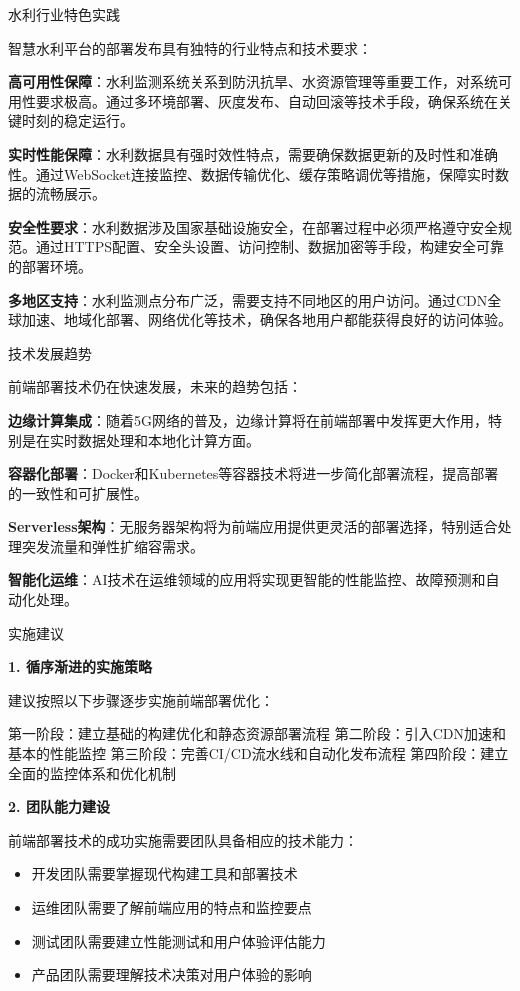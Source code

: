 {{ 水利行业特色实践

智慧水利平台的部署发布具有独特的行业特点和技术要求：

\textbf{高可用性保障}：水利监测系统关系到防汛抗旱、水资源管理等重要工作，对系统可用性要求极高。通过多环境部署、灰度发布、自动回滚等技术手段，确保系统在关键时刻的稳定运行。

\textbf{实时性能保障}：水利数据具有强时效性特点，需要确保数据更新的及时性和准确性。通过WebSocket连接监控、数据传输优化、缓存策略调优等措施，保障实时数据的流畅展示。

\textbf{安全性要求}：水利数据涉及国家基础设施安全，在部署过程中必须严格遵守安全规范。通过HTTPS配置、安全头设置、访问控制、数据加密等手段，构建安全可靠的部署环境。

\textbf{多地区支持}：水利监测点分布广泛，需要支持不同地区的用户访问。通过CDN全球加速、地域化部署、网络优化等技术，确保各地用户都能获得良好的访问体验。

 技术发展趋势

前端部署技术仍在快速发展，未来的趋势包括：

\textbf{边缘计算集成}：随着5G网络的普及，边缘计算将在前端部署中发挥更大作用，特别是在实时数据处理和本地化计算方面。

\textbf{容器化部署}：Docker和Kubernetes等容器技术将进一步简化部署流程，提高部署的一致性和可扩展性。

\textbf{Serverless架构}：无服务器架构将为前端应用提供更灵活的部署选择，特别适合处理突发流量和弹性扩缩容需求。

\textbf{智能化运维}：AI技术在运维领域的应用将实现更智能的性能监控、故障预测和自动化处理。

 实施建议

\textbf{1. 循序渐进的实施策略}

建议按照以下步骤逐步实施前端部署优化：

第一阶段：建立基础的构建优化和静态资源部署流程 第二阶段：引入CDN加速和基本的性能监控 第三阶段：完善CI/CD流水线和自动化发布流程 第四阶段：建立全面的监控体系和优化机制

\textbf{2. 团队能力建设}

前端部署技术的成功实施需要团队具备相应的技术能力：

\begin{itemize}
\tightlist
\item
  开发团队需要掌握现代构建工具和部署技术
\item
  运维团队需要了解前端应用的特点和监控要点
\item
  测试团队需要建立性能测试和用户体验评估能力
\item
  产品团队需要理解技术决策对用户体验的影响
\end{itemize}

}}
